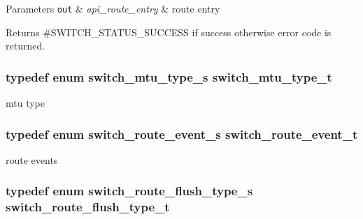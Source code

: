 \begin{DoxyParams}[1]{Parameters}
\mbox{\tt out}  & {\em api\+\_\+route\+\_\+entry} & route entry\\
\hline
\end{DoxyParams}
\begin{DoxyReturn}{Returns}
\#\+S\+W\+I\+T\+C\+H\+\_\+\+S\+T\+A\+T\+U\+S\+\_\+\+S\+U\+C\+C\+E\+S\+S if success otherwise error code is returned. 
\end{DoxyReturn}
\hypertarget{group__L3_gab24f93cedfd57f17218e312ce245638c}{
\subsubsection[{switch\+\_\+mtu\+\_\+type\+\_\+t}]{\setlength{\rightskip}{0pt plus 5cm}typedef enum {\bf switch\+\_\+mtu\+\_\+type\+\_\+s}  {\bf switch\+\_\+mtu\+\_\+type\+\_\+t}}}\label{group__L3_gab24f93cedfd57f17218e312ce245638c}
mtu type \hypertarget{group__L3_ga6c2b46748457866367ca6ac1e1da4667}{
\subsubsection[{switch\+\_\+route\+\_\+event\+\_\+t}]{\setlength{\rightskip}{0pt plus 5cm}typedef enum {\bf switch\+\_\+route\+\_\+event\+\_\+s}  {\bf switch\+\_\+route\+\_\+event\+\_\+t}}}\label{group__L3_ga6c2b46748457866367ca6ac1e1da4667}
route events \hypertarget{group__L3_ga5c0e408e2f48ba11ba7e824290d62547}{
\subsubsection[{switch\+\_\+route\+\_\+flush\+\_\+type\+\_\+t}]{\setlength{\rightskip}{0pt plus 5cm}typedef enum {\bf switch\+\_\+route\+\_\+flush\+\_\+type\+\_\+s}  {\bf switch\+\_\+route\+\_\+flush\+\_\+type\+\_\+t}}}\label{group__L3_ga5c0e408e2f48ba11ba7e824290d62547}
